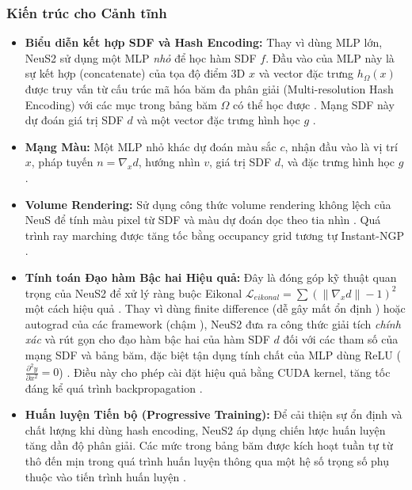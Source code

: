 \subsubsection{Kiến trúc cho Cảnh tĩnh}
\begin{itemize}
    \item \textbf{Biểu diễn kết hợp SDF và Hash Encoding:} Thay vì dùng MLP lớn, NeuS2 sử dụng một MLP \textit{nhỏ} để học hàm SDF $f$. Đầu vào của MLP này là sự kết hợp (concatenate) của tọa độ điểm 3D $x$ và vector đặc trưng $h_\Omega(x)$ được truy vấn từ cấu trúc mã hóa băm đa phân giải (Multi-resolution Hash Encoding) với các mục trong bảng băm $\Omega$ có thể học được \cite{Wang2023NeuS2_source_4, Wang2023NeuS2_source_22, Wang2023NeuS2_source_86, Wang2023NeuS2_source_110, Wang2023NeuS2_source_112}. Mạng SDF này dự đoán giá trị SDF $d$ và một vector đặc trưng hình học $g$ \cite{Wang2023NeuS2_source_112}.
    \item \textbf{Mạng Màu:} Một MLP nhỏ khác dự đoán màu sắc $c$, nhận đầu vào là vị trí $x$, pháp tuyến $n = \nabla_x d$, hướng nhìn $v$, giá trị SDF $d$, và đặc trưng hình học $g$ \cite{Wang2023NeuS2_source_114, Wang2023NeuS2_source_115}.
    \item \textbf{Volume Rendering:} Sử dụng công thức volume rendering không lệch của NeuS \cite{Wang2021NeuS} để tính màu pixel từ SDF và màu dự đoán dọc theo tia nhìn \cite{Wang2023NeuS2_source_116, Wang2023NeuS2_source_405, Wang2023NeuS2_source_409}. Quá trình ray marching được tăng tốc bằng occupancy grid tương tự Instant-NGP \cite{Wang2023NeuS2_source_117, Wang2023NeuS2_source_411, Wang2023NeuS2_source_412}.
    \item \textbf{Tính toán Đạo hàm Bậc hai Hiệu quả:} Đây là đóng góp kỹ thuật quan trọng của NeuS2 để xử lý ràng buộc Eikonal $\mathcal{L}_{eikonal} = \sum (\|\nabla_x d\| - 1)^2$ một cách hiệu quả \cite{Wang2023NeuS2_source_119, Wang2023NeuS2_source_120}. Thay vì dùng finite difference (dễ gây mất ổn định \cite{Wang2023NeuS2_source_99, Wang2023NeuS2_source_178}) hoặc autograd của các framework (chậm \cite{Wang2023NeuS2_source_124}), NeuS2 đưa ra công thức giải tích \textit{chính xác} và rút gọn cho đạo hàm bậc hai của hàm SDF $d$ đối với các tham số của mạng SDF và bảng băm, đặc biệt tận dụng tính chất của MLP dùng ReLU ($\frac{\partial^2 y}{\partial x^2} = 0$) \cite{Wang2023NeuS2_source_4, Wang2023NeuS2_source_25, Wang2023NeuS2_source_32, Wang2023NeuS2_source_100, Wang2023NeuS2_source_125, Wang2023NeuS2_source_129, Wang2023NeuS2_source_130}. Điều này cho phép cài đặt hiệu quả bằng CUDA kernel, tăng tốc đáng kể quá trình backpropagation \cite{Wang2023NeuS2_source_4, Wang2023NeuS2_source_132}.
    \item \textbf{Huấn luyện Tiến bộ (Progressive Training):} Để cải thiện sự ổn định và chất lượng khi dùng hash encoding, NeuS2 áp dụng chiến lược huấn luyện tăng dần độ phân giải. Các mức trong bảng băm được kích hoạt tuần tự từ thô đến mịn trong quá trình huấn luyện thông qua một hệ số trọng số phụ thuộc vào tiến trình huấn luyện \cite{Wang2023NeuS2_source_5, Wang2023NeuS2_source_26, Wang2023NeuS2_source_33, Wang2023NeuS2_source_109, Wang2023NeuS2_source_135, Wang2023NeuS2_source_136, Wang2023NeuS2_source_137}.
\end{itemize}

